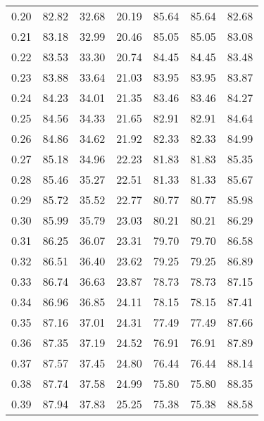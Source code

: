 \begin{tabular}{|c|c|c|c|c|c|c|}
      0.20 &     82.82 &     32.68 &      20.19 &   85.64 &      85.64 &         82.68 \\
      0.21 &     83.18 &     32.99 &      20.46 &   85.05 &      85.05 &         83.08 \\
      0.22 &     83.53 &     33.30 &      20.74 &   84.45 &      84.45 &         83.48 \\
      0.23 &     83.88 &     33.64 &      21.03 &   83.95 &      83.95 &         83.87 \\
      0.24 &     84.23 &     34.01 &      21.35 &   83.46 &      83.46 &         84.27 \\
      0.25 &     84.56 &     34.33 &      21.65 &   82.91 &      82.91 &         84.64 \\
      0.26 &     84.86 &     34.62 &      21.92 &   82.33 &      82.33 &         84.99 \\
      0.27 &     85.18 &     34.96 &      22.23 &   81.83 &      81.83 &         85.35 \\
      0.28 &     85.46 &     35.27 &      22.51 &   81.33 &      81.33 &         85.67 \\
      0.29 &     85.72 &     35.52 &      22.77 &   80.77 &      80.77 &         85.98 \\
      0.30 &     85.99 &     35.79 &      23.03 &   80.21 &      80.21 &         86.29 \\
      0.31 &     86.25 &     36.07 &      23.31 &   79.70 &      79.70 &         86.58 \\
      0.32 &     86.51 &     36.40 &      23.62 &   79.25 &      79.25 &         86.89 \\
      0.33 &     86.74 &     36.63 &      23.87 &   78.73 &      78.73 &         87.15 \\
      0.34 &     86.96 &     36.85 &      24.11 &   78.15 &      78.15 &         87.41 \\
      0.35 &     87.16 &     37.01 &      24.31 &   77.49 &      77.49 &         87.66 \\
      0.36 &     87.35 &     37.19 &      24.52 &   76.91 &      76.91 &         87.89 \\
      0.37 &     87.57 &     37.45 &      24.80 &   76.44 &      76.44 &         88.14 \\
      0.38 &     87.74 &     37.58 &      24.99 &   75.80 &      75.80 &         88.35 \\
      0.39 &     87.94 &     37.83 &      25.25 &   75.38 &      75.38 &         88.58 \\

\end{tabular}
